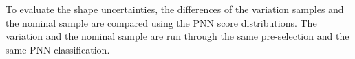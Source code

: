 
To evaluate the shape uncertainties, the differences of the variation samples and the nominal sample are compared using the PNN score distributions. 
The variation and the nominal sample are run through the same pre-selection and the same PNN classification. 


